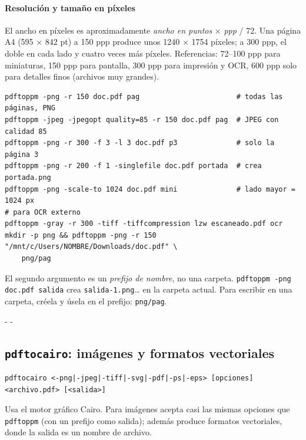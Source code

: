 \documentclass[11pt,a4paper]{article}
\makeatletter
\newcommand{\necesitaespacio}[1]{\par\penalty-100\begingroup
	\setlength{\dimen@}{#1}\dimen@ii\pagegoal\advance\dimen@ii-\pagetotal
	\ifdim\dimen@>\dimen@ii\ifdim\dimen@ii>\z@\vfil\fi\penalty-\@M\fi\endgroup}
\newcommand{\cmd}[1]{\texttt{\textcolor{colcmd}{#1}}}      %
\newcommand{\arch}[1]{\texttt{\textcolor{colarch}{#1}}}    %
\makeatother
\begin{document}
	\paragraph{Resolución y tamaño en píxeles} El ancho en píxeles es aproximadamente \emph{ancho en puntos} $\times$ \emph{ppp} / 72. Una página A4 (595 × 842 pt) a 150 ppp produce unos 1240 × 1754 píxeles; a 300 ppp, el doble en cada lado y cuatro veces más píxeles. Referencias: 72--100 ppp para miniaturas, 150 ppp para pantalla, 300 ppp para impresión y OCR, 600 ppp solo para detalles finos (archivos muy grandes).
	\newpage
	
	\begin{lstlisting}
pdftoppm -png -r 150 doc.pdf pag                       # todas las páginas, PNG
pdftoppm -jpeg -jpegopt quality=85 -r 150 doc.pdf pag  # JPEG con calidad 85
pdftoppm -png -r 300 -f 3 -l 3 doc.pdf p3              # solo la página 3
pdftoppm -png -r 200 -f 1 -singlefile doc.pdf portada  # crea portada.png
pdftoppm -png -scale-to 1024 doc.pdf mini              # lado mayor = 1024 px
# para OCR externo
pdftoppm -gray -r 300 -tiff -tiffcompression lzw escaneado.pdf ocr
mkdir -p png && pdftoppm -png -r 150 "/mnt/c/Users/NOMBRE/Downloads/doc.pdf" \
    png/pag
\end{lstlisting}
	
	\begin{advertencia}
		El segundo argumento es un \emph{prefijo de nombre}, no una carpeta. \cmd{pdftoppm -png doc.pdf salida} crea \arch{salida-1.png}\ldots{} en la carpeta actual. Para escribir en una carpeta, créela y úsela en el prefijo: \arch{png/pag}.
	\end{advertencia}
	
	\necesitaespacio{8\baselineskip}
	\subsection{\texttt{pdftocairo}: imágenes y formatos vectoriales}\label{sec:pdftocairo}
	
	\begin{lstlisting}[style=sintaxis]
pdftocairo <-png|-jpeg|-tiff|-svg|-pdf|-ps|-eps> [opciones] <archivo.pdf> [<salida>]
\end{lstlisting}
	
	Usa el motor gráfico Cairo. Para imágenes acepta casi las mismas opciones que \cmd{pdftoppm} (con un prefijo como salida); además produce formatos vectoriales, donde la salida es un nombre de archivo.
	
\end{document}
